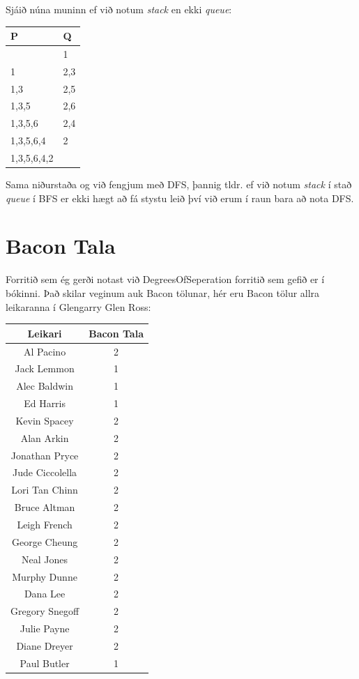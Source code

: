 \documentclass{article}
\begin{document}
Sjáið núna muninn ef við notum \emph{stack} en ekki \emph{queue}:
\begin{center}
    \begin{tabular}{|l|l|}
        \hline
        P&Q\\
        \hline
        &1\\
        \hline
        1&2,3\\
        \hline
        1,3&2,5\\
        \hline
        1,3,5&2,6\\
        \hline
        1,3,5,6&2,4\\
        \hline
        1,3,5,6,4&2\\
        \hline
        1,3,5,6,4,2&\\
        \hline
    \end{tabular}
\end{center}
Sama niðurstaða og við fengjum með DFS, þannig tldr. ef við notum \emph{stack} í stað \emph{queue} í BFS er ekki hægt að fá stystu leið því við erum í raun bara að nota DFS.

\section*{Bacon Tala}
Forritið sem ég gerði notast við DegreesOfSeperation forritið sem gefið er í bókinni. Það skilar veginum auk Bacon tölunar, hér eru Bacon tölur allra leikaranna í Glengarry Glen Ross:
\begin{center}
    \begin{tabular}{|c|c|}
        \hline
        Leikari&Bacon Tala\\
        \hline
        Al Pacino&2\\
        \hline
        Jack Lemmon&1\\
        \hline
        Alec Baldwin&1\\
        \hline
        Ed Harris&1\\
        \hline
        Kevin Spacey&2\\
        \hline
        Alan Arkin&2\\
        \hline
        Jonathan Pryce&2\\
        \hline
        Jude Ciccolella&2\\
        \hline
        Lori Tan Chinn&2\\
        \hline
        Bruce Altman&2\\
        \hline
        Leigh French&2\\
        \hline
        George Cheung&2\\
        \hline
        Neal Jones&2\\
        \hline
        Murphy Dunne&2\\
        \hline
        Dana Lee&2\\
        \hline
        Gregory Snegoff&2\\
        \hline
        Julie Payne&2\\
        \hline
        Diane Dreyer&2\\
        \hline
        Paul Butler&1\\
        \hline
    \end{tabular}
\end{center}
\end{document}
